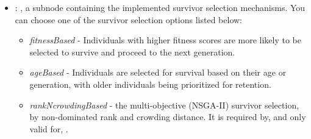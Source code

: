 \begin{itemize}
\begin{itemize}
\begin{itemize}
\begin{itemize}
                \item {}: ,
                  The probability governing the mutation step, i.e., the probability that if
                  exceeded mutation will occur.
                  The  node recognizes the following parameters:
                    \begin{itemize}
                      \item {}: ,
                        type of mutation probability operation to be used (e.g., static, adaptive)
                  \end{itemize}
              \end{itemize}
          \end{itemize}

        \item {}: ,
          a subnode containing the implemented survivor selection mechanisms. You can choose one of
          the survivor selection options listed below:                   \begin{itemize}
          \item \textit{fitnessBased} - Individuals with higher fitness scores are more likely to be
          selected to survive and                     proceed to the next generation.
          \item \textit{ageBased} - Individuals are selected for survival based on their age or
          generation, with older individuals being prioritized                     for retention.
          \item \textit{rankNcrowdingBased} - the multi-objective (NSGA-II) survivor selection, by
          non-dominated rank and                     crowding distance. It is required by, and only
          valid for, .                   \end{itemize}


\end{itemize}
\end{itemize}
